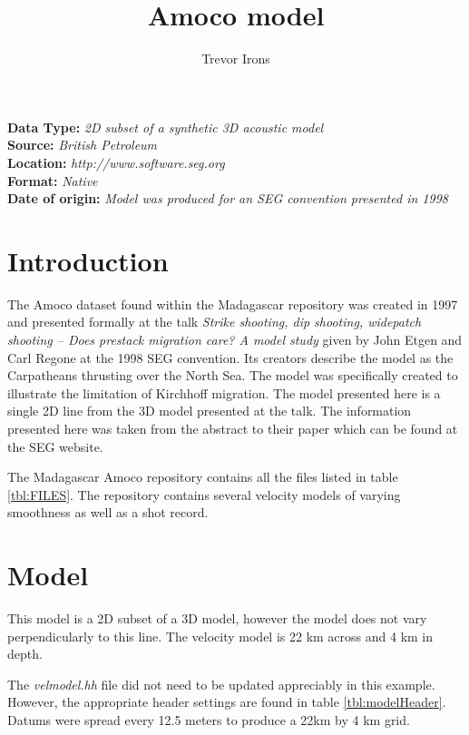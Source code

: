 \title{Amoco model}
\author{Trevor Irons}
\shortpaper
\maketitle
\lstset{language=python,numbers=left,numberstyle=\tiny,showstringspaces=false}

\noindent
\textbf {Data Type:} \emph{2D subset of a synthetic 3D acoustic model}\\
\textbf {Source:} \emph{British Petroleum}\\
\textbf {Location:} \emph{http://www.software.seg.org}\\
\textbf {Format:} \emph{Native} \\
\textbf{Date of origin:} \emph{Model was produced for an SEG convention presented in 1998}\\

\section{Introduction}
The Amoco dataset found within the Madagascar repository was created in 1997 and presented 
formally at the talk \emph{Strike shooting, dip shooting, widepatch shooting -- Does prestack 
migration care? A model study} given by John Etgen and Carl Regone at the 1998 SEG convention.  
Its creators describe the model as the Carpatheans thrusting over the North Sea.  
The model was specifically created to illustrate the limitation of Kirchhoff migration.  
The model presented here is a single 2D line from the 3D model presented at the talk.  
The information presented here was taken from the abstract to their paper which can be found at the SEG website.  

The Madagascar Amoco repository contains all the files listed in table \ref{tbl:FILES}.  The repository contains several velocity models of varying smoothness as well as a shot record.   

{
\tiny

\normalsize
}

\section{Model}
This model is a 2D subset of a 3D model, however the model does not vary perpendicularly to this line.  The velocity model is 22 km across and 4 km in depth.

The \emph{velmodel.hh} file did not need to be updated appreciably in this example.  However, the appropriate header settings are found in table \ref{tbl:modelHeader}.  Datums were spread every 12.5 meters to produce a 22km by 4 km grid.  
 
